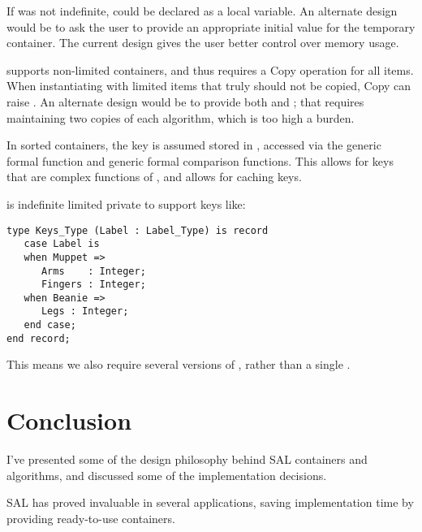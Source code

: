 \documentclass{article}
\begin{document}
If  was not indefinite, 
could be declared as a local variable. An alternate design would be to
ask the user to provide an appropriate initial value for the temporary
container. The current design gives the user better control over
memory usage.

 supports non-limited containers, and thus requires a
Copy operation for all items. When instantiating with limited items
that truly should not be copied, Copy can raise
. An alternate design would be to provide
both  and ; that
requires maintaining two copies of each algorithm, which is too high a
burden.
      
In sorted containers, the key is assumed stored in ,
accessed via the generic formal function  and generic
formal comparison functions. This allows for keys that are complex
functions of , and allows for caching keys.

 is indefinite limited private to
support keys like:
\begin{verbatim}
type Keys_Type (Label : Label_Type) is record
   case Label is
   when Muppet =>
      Arms    : Integer;
      Fingers : Integer;
   when Beanie =>
      Legs : Integer;
   end case;
end record;
\end{verbatim}
This means we also require several versions of , rather than a single
.

\section{Conclusion}
I've presented some of the design philosophy behind SAL containers and
algorithms, and discussed some of the implementation decisions.

SAL has proved invaluable in several applications, saving
implementation time by providing ready-to-use containers.
\end{document}
